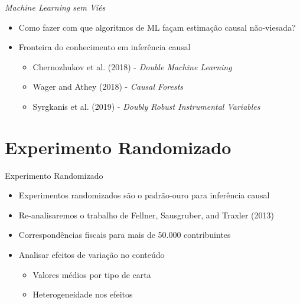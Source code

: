 \documentclass[
  12pt,
  ignorenonframetext,
  aspectratio=169]{beamer}
\providecommand{\tightlist}{%
  \setlength{\itemsep}{0pt}\setlength{\parskip}{0pt}}
\begin{document}
\begin{frame}{\emph{Machine Learning sem Viés}}
\protect\hypertarget{machine-learning-sem-viuxe9s-1}{}
\begin{itemize}
\item
  Como fazer com que algoritmos de ML façam estimação causal
  não-viesada?
\item
  Fronteira do conhecimento em inferência causal

  \begin{itemize}
  \tightlist
  \item
    Chernozhukov et al. (2018) - \emph{Double Machine Learning}
  \item
    Wager and Athey (2018) - \emph{Causal Forests}
  \item
    Syrgkanis et al. (2019) - \emph{Doubly Robust Instrumental
    Variables}
  \end{itemize}
\end{itemize}
\end{frame}

\hypertarget{experimento}{%
\section{Experimento Randomizado}\label{experimento}}

\begin{frame}{Experimento Randomizado}
\protect\hypertarget{experimento-randomizado}{}
\begin{itemize}
\item
  Experimentos randomizados são o padrão-ouro para inferência causal
\item
  Re-analisaremos o trabalho de Fellner, Sausgruber, and Traxler (2013)
\item
  Correspondências fiscais para mais de 50.000 contribuintes
\item
  Analisar efeitos de variação no conteúdo

  \begin{itemize}
  \tightlist
  \item
    Valores médios por tipo de carta
  \item
    Heterogeneidade nos efeitos
  \end{itemize}
\end{itemize}
\end{frame}
\end{document}
